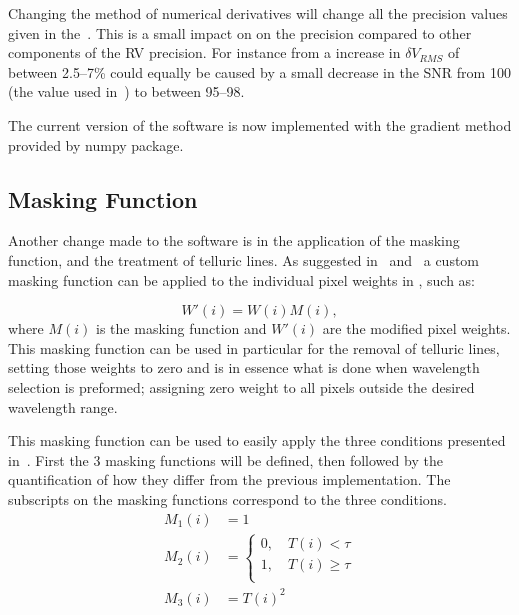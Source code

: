 Changing the method of numerical derivatives will change all the precision values given in the~\citet{figueira_radial_2016}. This is a small impact on on the precision compared to other components of the {RV} precision. For instance from  a increase in \(\delta V_{RMS}\) of between 2.5--7\%  could equally be caused by a small decrease in the {SNR} from 100 (the value used in~\citet{figueira_radial_2016}) to between 95--98.

The current version of the software is now implemented with the gradient method provided by numpy package.

\subsection{Masking Function}
\label{subsec:masking_function}
Another change made to the software is in the application of the masking function, and the treatment of telluric lines. As suggested in~\cite{connes_absolute_1985} and~\cite{bouchy_fundamental_2001} a custom masking function can be applied to the individual pixel weights in , such as:

\[W'(i) = W(i)M(i),\label{eq:mask_function}\] where \(M(i)\) is the masking function and \(W'(i)\) are the modified pixel weights.
This masking function can be used in particular for the removal of telluric lines, setting those weights to zero and is in essence what is done when wavelength selection is preformed; assigning zero weight to all pixels outside the desired wavelength range.

This masking function can be used to easily apply the three conditions presented in~\citet{figueira_radial_2016}. First  the 3 masking functions will be defined, then followed by the quantification of how they differ from the previous implementation. The subscripts on the masking functions correspond to the three conditions.
\begin{align}
M_1(i) &= 1 \label{eq:mask1}\\
M_2(i) &= \begin{cases}
0, \hspace{1em} T(i) < \tau\\
1, \hspace{1em} T(i) \ge \tau\\
\end{cases}\label{eq:mask2}\\
M_3(i) &= {T(i)}^{2} \label{eq:mask3}
\end{align}

